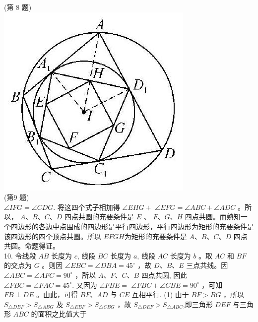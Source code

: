 \documentclass[10pt]{article}
\begin{document}
(第 8 题)\\
\includegraphics[max width=\textwidth, center]{2024_10_30_66b8e5e701da2093c133g-097(2)}\\
(第9 题)\\
$\angle I F G=\angle C D G$. 将这四个式子相加得 $\angle E H G+$ $\angle E F G=\angle A B C+\angle A D C$ 。所以， $A 、 B 、 C 、 D$ 四点共圆的充要条件是 $E$ 、 $F 、 G 、 H$ 四点共圆。而熟知一个四边形的各边中点围成的四边形是平行四边形，平行四边形为矩形的充要条件是该四边形的四个顶点共圆。所以 $E F G H$为矩形的充要条件是 $A 、 B 、 C 、 D$ 四点共圆。命题得证。\\
10. 令线段 $A B$ 长度为 $c$, 线段 $B C$ 长度为 $a$, 线段 $A C$ 长度为 $b$ 。取 $A C$ 和 $B F$ 的交点为 $G$ 。则因 $\angle E B C=\angle D B A=45^{\circ}$ ，故 $D 、 B 、 E$ 三点共线。因 $\angle A B C=\angle A F C=90^{\circ}$ ，所以 $A 、 F 、 C 、 B$ 四点共圆, 因此 $\angle F B C=\angle F A C=45^{\circ}$. 又因为 $\angle F B E=$ $\angle F B C+\angle C B E=90^{\circ}$ ，可知 $F B \perp D E$ 。由此，可得 $B F 、 A D$ 与 $C E$ 互相平行. (1) 由于 $B F>B G$ ，所以 $S_{\triangle D B F}>S_{\triangle A B G}$ 及 $S_{\triangle E B F}>S_{\triangle C B G}$ ，故 $S_{\triangle D E F}>S_{\triangle A B C}$,即三角形 $D E F$ 与三角形 $A B C$ 的面积之比值大于\\
\end{document}
